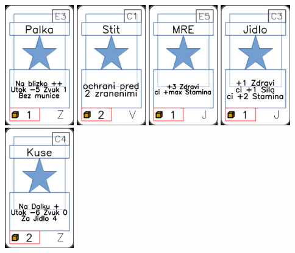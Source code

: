 \documentclass[a4paper]{article}
\begin{document}
	\includegraphics[width=3.0cm]{img-1_82}
	\includegraphics[width=3.0cm]{img-1_70}
	\includegraphics[width=3.0cm]{img-1_24}
	\includegraphics[width=3.0cm]{img-1_12}
	\includegraphics[width=3.0cm]{img-1_103}
\end{document}
